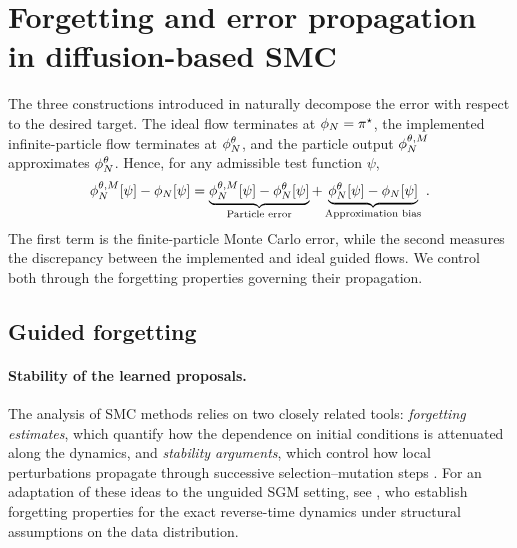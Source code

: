 \documentclass[11pt]{article}
\theoremstyle{plain}
\theoremstyle{definition}
\theoremstyle{remark}
\begin{document}
\section{Forgetting and error propagation in diffusion-based SMC}
\label{sec:stability_error}

The three constructions introduced in
 naturally decompose the error with respect to
the desired target. The ideal flow terminates at
$\filter{N}=\pi^\star$, the implemented infinite-particle flow
terminates at $\approxfilter{N}$, and the particle output
$\mcfilter{N}$ approximates $\approxfilter{N}$. Hence, for any
admissible test function $\psi$,
\begin{equation}
\label{eq:error_decomposition}
\mcfilter{N}[\psi]-\filter{N}[\psi]
=
\underbrace{
\mcfilter{N}[\psi]-\approxfilter{N}[\psi]
}_{\text{Particle error}}
+
\underbrace{
\approxfilter{N}[\psi]-\filter{N}[\psi]
}_{\text{Approximation bias}}
\eqsp.
\end{equation}
The first term is the finite-particle Monte Carlo error, while the second measures the discrepancy between the implemented and ideal guided flows. We control both through the forgetting properties governing their propagation.





\subsection{Guided forgetting}
\label{sec:guided_forgetting}

\paragraph{Stability of the learned proposals.}
The analysis of SMC methods relies on two closely related tools: \textit{forgetting estimates}, which quantify how the dependence on initial conditions is attenuated along the dynamics, and \textit{stability arguments}, which control how local perturbations propagate through successive selection--mutation steps \citep{HairerMattingly2008,delmoral2004feynman,whiteley2012sequential,douc2014longterm}. For an adaptation of these ideas to the unguided SGM setting, see \citet{strasman2026forgetting}, who establish forgetting properties for the exact reverse-time dynamics under structural assumptions on the data distribution.
\end{document}
